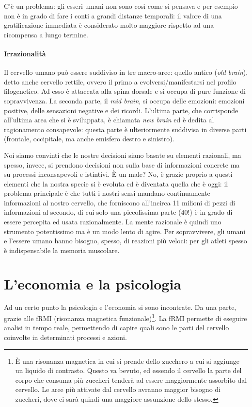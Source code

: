 C'è un problema: gli esseri umani non sono così come si pensava e per esempio
non è in grado di fare i conti a grandi distanze temporali: il valore di una
gratificazione immediata è considerato molto maggiore rispetto ad una
ricompensa a lungo termine.

\paragraph*{Irrazionalità} 
Il cervello umano può essere suddiviso in tre macro-aree: quello
antico (\textit{old brain}), detto anche cervello rettile, ovvero il primo a
evolversi/manifestarsi nel profilo filogenetico. Ad esso è attaccata alla
spina dorsale e si occupa di pure funzione di sopravvivenza.
La seconda parte, il \textit{mid brain}, si occupa delle emozioni: emozioni
positive, delle sensazioni negative e dei ricordi.
L'ultima parte, che corrisponde all'ultima area che si è sviluppata, è chiamata
\textit{new brain} ed è dedita al ragionamento consapevole: questa parte è
ulteriormente suddivisa in diverse parti (frontale, occipitale, ma anche
emisfero destro e sinistro).

Noi siamo convinti che le nostre decisioni siano basate su elementi razionali,
ma spesso, invece, si prendono decisioni non sulla base di informazioni
concrete ma su processi inconsapevoli e istintivi.
È un male? No, è grazie proprio a questi elementi che la nostra specie si è
evoluta ed è diventata quella che è oggi: il problema principale è che tutti i
nostri sensi mandano continuamente informazioni al nostro cervello, che
forniscono all'incirca 11 milioni di pezzi di informazioni al secondo, di cui
solo una piccolissima parte (40!) è in grado di essere percepita ed usata
razionalmente. La mente razionale è quindi uno strumento potentissimo ma è un
modo lento di agire. Per sopravvivere, gli umani e l'essere umano hanno
bisogno, spesso, di reazioni più veloci: per gli atleti spesso è indispensabile
la memoria muscolare.

\section{L'economia e la psicologia}

Ad un certo punto la psicologia e l'economia si sono incontrate.
Da una parte, grazie alle fRMI (risonanza magnetica funzionale)\footnote{È una
risonanza magnetica in cui si prende dello zucchero a cui si aggiunge un
liquido di contrasto. Questo va bevuto, ed essendo il cervello la parte del
corpo che consuma più zuccheri tenderà ad essere maggiormente assorbito dal
cervello. Le aree più attivate dal cervello avranno maggior bisogno di
zuccheri, dove ci sarà quindi una maggiore assunzione dello stesso.}. La fRMI
permette di eseguire analisi in tempo reale, permettendo di capire quali sono
le parti del cervello coinvolte in determinati processi e azioni.

